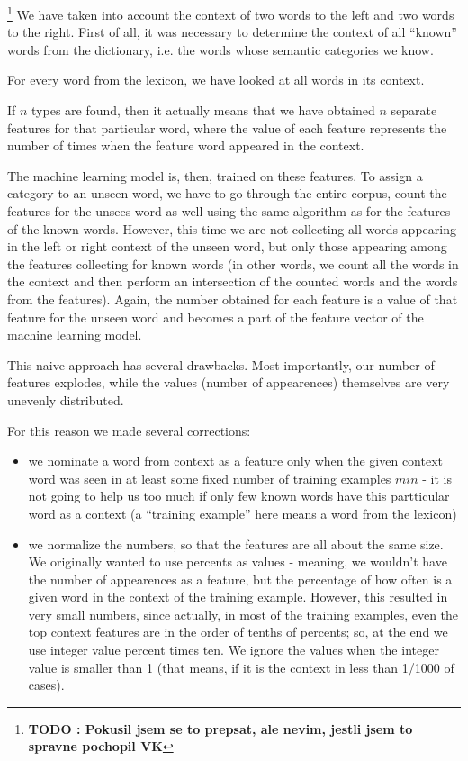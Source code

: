 \documentclass[letterpaper]{article}
\newcommand{\todofn}[1] {
 \footnote{\textbf{TODO : #1}}}
\begin{document}
\todofn{Pokusil jsem se to prepsat, ale nevim, jestli jsem to spravne pochopil VK}
We have taken into account the context of two words to the left and two words to the right. 
First of all, it was necessary to determine the context of all ``known'' words from the dictionary, i.e. the words whose semantic categories we know.  

For every word from the lexicon, we 
have looked at all words in its context.

If $n$ types are found, then it actually means that we have obtained $n$ separate 
features for that particular word, where the value of each feature represents 
the number of times when the feature word appeared in the context.
 
The machine learning model is, then, trained on these features. To assign a category
to an unseen word, we have to go through the entire corpus, count
the features for the unsees word as well using the same algorithm as for the features of the known words. However, this time we are not collecting all words appearing in the left or right context of the unseen word, but only those appearing among the features collecting for known words (in other words, we count all the words in the context and then perform an 
intersection of the counted words and the words from the features). Again, the number obtained for each feature is a value of that feature for the unseen word and becomes a part of the feature vector of the machine learning model.

This naive approach has several drawbacks. Most importantly, our number of features explodes, while the values (number of appearences) themselves are very unevenly distributed.

For this reason we made several corrections:
\begin{itemize}
    \item we nominate a word from context as a feature only when the given context word was seen in at least some fixed number of training examples $min$ - it is not going to help us too much 
if only few known words have this partticular word as a context (a ``training example'' here means a word from the lexicon)
    
    \item we normalize the numbers, so that the features are all about 
the same size. We originally wanted to use percents as values - meaning, 
we wouldn't have the number of appearences as a feature, but the percentage of how often is a given word in the context of the training example.    
     However, this resulted in very small numbers, since actually, 
in most of the training examples, even the top context features are in the order of 
tenths of percents; so, at the end we use integer value percent times ten. 
We ignore the values when the integer value is smaller than 1 (that means, if it is the context in less than 1/1000 of cases).
     

\end{itemize}
\end{document}
